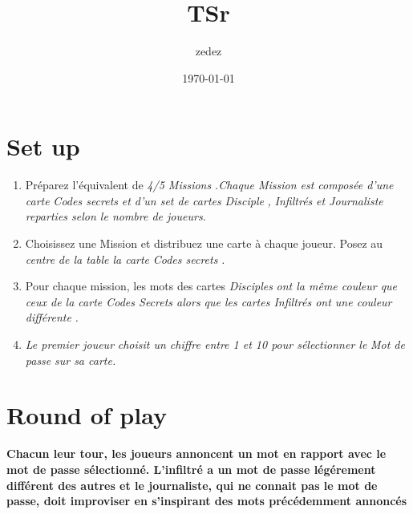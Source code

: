 \documentclass{article}%
\title{TSr}%
\author{zedez}%
\date{\today}%
\begin{document}
%
\pagestyle{empty}%
\normalsize%
\maketitle%
\section{ Set up
}%
\label{sec:Setup}%
\begin{enumerate}%
\item%
%
  Préparez l'équivalent de %
\textit{4/5 Missions}%
\textit{.Chaque Mission est composée d'une carte }%
\textit{Codes secrets}%
\textit{ et d'un set de cartes }%
\textit{Disciple}%
\textit{,}%
\textit{ Infiltrés}%
\textit{ et Journaliste reparties selon le nombre de joueurs.
}%
\item%
%
  Choisissez une Mission et distribuez une carte à chaque joueur. Posez au %
\textit{centre}%
\textit{ de la table la carte }%
\textit{Codes secrets}%
\textit{.
}%
\item%
%
  Pour chaque mission, les mots des cartes %
\textit{Disciples}%
\textit{ ont la même couleur que ceux de la carte Codes Secrets alors que les cartes Infiltrés ont une couleur }%
\textit{différente}%
\textit{.
}%
\item%
%
\textit{Le premier joueur}%
\textit{ choisit un chiffre entre 1 et 10 pour sélectionner le }%
\textit{Mot de passe}%
\textit{ sur sa carte.
}%
\end{enumerate}

%
\section{ Round of play
}%
\label{sec:Roundofplay}%
\textbf{Chacun leur tour, les joueurs annoncent un mot en rapport avec le mot de passe sélectionné. L'infiltré a un mot de passe légérement différent des autres et le journaliste, qui ne connait pas le mot de passe, doit improviser en s'inspirant des mots précédemment annoncés}

%
\end{document}
